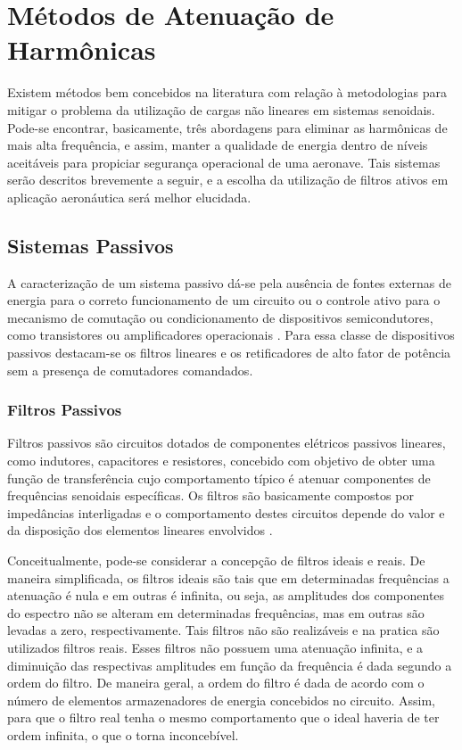 \section{Métodos de Atenuação de Harmônicas}

Existem métodos bem concebidos na literatura com relação à metodologias para mitigar o problema da utilização de cargas não lineares em sistemas senoidais. Pode-se encontrar, basicamente, três abordagens para eliminar as harmônicas de mais alta frequência, e assim, manter a qualidade de energia dentro de níveis aceitáveis para propiciar segurança operacional de uma aeronave. Tais sistemas serão descritos brevemente a seguir, e a escolha da utilização de filtros ativos em aplicação aeronáutica será melhor elucidada.  

\subsection{Sistemas Passivos}

A caracterização de um sistema passivo dá-se pela ausência de fontes externas de energia para o correto funcionamento de um circuito ou o controle ativo para o mecanismo de comutação ou condicionamento de dispositivos semicondutores, como transistores ou amplificadores operacionais \cite{AN779}. Para essa classe de dispositivos passivos destacam-se os filtros lineares e os retificadores de alto fator de potência sem a presença de comutadores comandados. 

\subsubsection{Filtros Passivos}

Filtros passivos são circuitos dotados de componentes elétricos passivos lineares, como indutores, capacitores e resistores, concebido com objetivo de obter uma função de transferência cujo comportamento típico é atenuar componentes de frequências senoidais específicas. Os filtros são basicamente compostos por impedâncias interligadas e o comportamento destes circuitos depende do valor e da disposição dos elementos lineares envolvidos \cite{Mussoi2004,Kassick2010}. 

Conceitualmente, pode-se considerar a concepção de filtros ideais e reais. De maneira simplificada, os filtros ideais são tais que em determinadas frequências a atenuação é nula e em outras é infinita, ou seja, as amplitudes dos componentes do espectro não se alteram em determinadas frequências, mas em outras são levadas a zero, respectivamente. Tais filtros não são realizáveis e na pratica são utilizados filtros reais. Esses filtros não possuem uma atenuação infinita, e a diminuição das respectivas amplitudes em função da frequência é dada segundo a ordem do filtro. De maneira geral, a ordem do filtro é dada de acordo com o número de elementos armazenadores de energia concebidos no circuito. Assim, para que o filtro real tenha o mesmo comportamento que o ideal haveria de ter ordem infinita, o que o torna inconcebível. 

